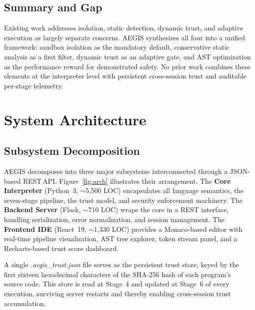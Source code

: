 \documentclass[conference]{IEEEtran}
\begin{document}
\subsection{Summary and Gap}

Existing work addresses isolation, static detection, dynamic trust,
and adaptive execution as largely separate concerns. AEGIS
synthesizes all four into a unified framework: sandbox isolation as
the mandatory default, conservative static analysis as a first
filter, dynamic trust as an adaptive gate, and AST optimization as
the performance reward for demonstrated safety. No prior work
combines these elements at the interpreter level with persistent
cross-session trust and auditable per-stage telemetry.

\section{System Architecture}
\label{sec:arch}

\subsection{Subsystem Decomposition}

AEGIS decomposes into three major subsystems interconnected through
a JSON-based REST\,API. Figure~\ref{fig:arch} illustrates their
arrangement. The \textbf{Core Interpreter} (Python~3, $\sim$5,500
LOC) encapsulates all language semantics, the seven-stage pipeline,
the trust model, and security enforcement machinery. The
\textbf{Backend Server} (Flask, $\sim$710 LOC) wraps the core in a
REST interface, handling serialization, error normalization, and
session management. The \textbf{Frontend IDE} (React~19, $\sim$1,330
LOC) provides a Monaco-based editor with real-time pipeline
visualization, AST tree explorer, token stream panel, and a
Recharts-based trust score dashboard.

A single \textit{.aegis\_trust.json} file serves as the persistent
trust store, keyed by the first sixteen hexadecimal characters of the
SHA-256 hash of each program's source code. This store is read at
Stage~4 and updated at Stage~6 of every execution, surviving server
restarts and thereby enabling cross-session trust accumulation.
\end{document}
